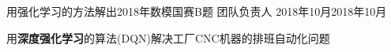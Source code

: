 
\begin{projitem}
    {用强化学习的方法解出2018年数模国赛B题}
    {团队负责人}
    {2018年10月}{2018年10月 }
    \item 用\textbf{深度强化学习}的算法(DQN)解决工厂CNC机器的排班自动化问题
\end {projitem}

\endinput